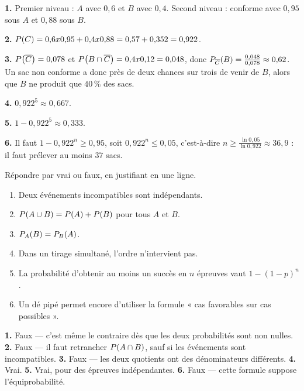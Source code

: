 \begin{corrige}
\textbf{1.} Premier niveau : $A$ avec $0{,}6$ et $B$ avec $0{,}4$. Second
niveau : conforme avec $0{,}95$ sous $A$ et $0{,}88$ sous $B$.

\textbf{2.} $\proba{C} = 0{,}6 \times 0{,}95+0{,}4 \times 0{,}88
= 0{,}57+0{,}352 = 0{,}922$.

\textbf{3.} $\proba{\evtc{C}} = 0{,}078$ et
$\proba{B \cap \evtc{C}} = 0{,}4 \times 0{,}12 = 0{,}048$, donc
$\probacond{B}{\evtc{C}} = \frac{0{,}048}{0{,}078} \approx 0{,}62$. Un sac
non conforme a donc près de deux chances sur trois de venir de $B$, alors que
$B$ ne produit que $40\,\%$ des sacs.

\textbf{4.} $0{,}922^{5} \approx 0{,}667$.

\textbf{5.} $1-0{,}922^{5} \approx 0{,}333$.

\textbf{6.} Il faut $1-0{,}922^{n} \geq 0{,}95$, soit
$0{,}922^{n} \leq 0{,}05$, c'est-à-dire
$n \geq \frac{\ln0{,}05}{\ln0{,}922} \approx 36{,}9$ : il faut prélever au
moins $37$ sacs.
\end{corrige}

\begin{jemeteste}
Répondre par vrai ou faux, en justifiant en une ligne.

\begin{enumerate}[label=\textbf{\arabic*.}, leftmargin=*, itemsep=0.28em]
  \item Deux événements incompatibles sont indépendants.
  \item $\proba{A \cup B} = \proba{A}+\proba{B}$ pour tous $A$ et $B$.
  \item $\probacond{B}{A} = \probacond{A}{B}$.
  \item Dans un tirage simultané, l'ordre n'intervient pas.
  \item La probabilité d'obtenir au moins un succès en $n$ épreuves vaut
        $1-(1-p)^{n}$.
  \item Un dé pipé permet encore d'utiliser la formule « cas favorables sur
        cas possibles ».
\end{enumerate}
\end{jemeteste}

\begin{corrige}[je me teste]
\textbf{1.} Faux — c'est même le contraire dès que les deux probabilités sont
non nulles.
\textbf{2.} Faux — il faut retrancher $\proba{A \cap B}$, sauf si les
événements sont incompatibles.
\textbf{3.} Faux — les deux quotients ont des dénominateurs différents.
\textbf{4.} Vrai.
\textbf{5.} Vrai, pour des épreuves indépendantes.
\textbf{6.} Faux — cette formule suppose l'équiprobabilité.
\end{corrige}

